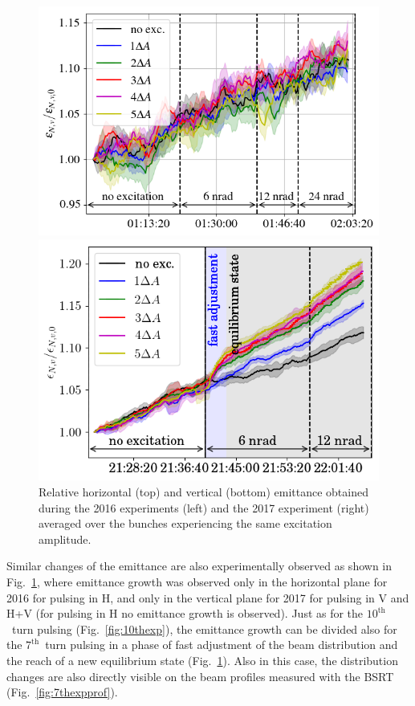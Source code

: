 \documentclass[%
 reprint,
 amsmath,amssymb,
 aps,
prstab,
]{revtex4-1}
\begin{document}
\begin{figure}[h]
\begin{minipage}[t]{0.49\linewidth}
	\end{minipage}	
	\begin{minipage}[t]{0.49\linewidth}
		\centering
		\includegraphics[width=1.0\linewidth]{2016_emitv_avg_rel_h7th_no_damper.png}
	\end{minipage}	
	\begin{minipage}[t]{0.49\linewidth}
		\centering
		\includegraphics[width=1.0\linewidth]{2017_emitv_avg_rel_hv7th_no_damper.png}
	\end{minipage}	
	\caption{\label{fig:7thexp} Relative horizontal (top) and vertical (bottom) emittance obtained during the 2016 experiments (left) and the 2017 experiment (right) averaged over the bunches experiencing the same excitation amplitude.}
\end{figure}
Similar changes of the emittance are also experimentally observed as shown in Fig.~\ref{fig:7thexp}, where emittance growth was observed only in the horizontal plane for 2016 for pulsing in H, and only in the vertical plane for 2017 for pulsing in V and H+V (for pulsing in H no emittance growth is observed). Just as for the $10^{\mathrm{th}}$~turn pulsing (Fig.~\ref{fig:10thexp}), the emittance growth can be divided also for the $7^{\mathrm{th}}$~turn pulsing in a phase of fast adjustment of the beam distribution and the reach of a new equilibrium state (Fig.~\ref{fig:7thexp}). Also in this case, the distribution changes are also directly visible on the beam profiles measured with the BSRT (Fig.~\ref{fig:7thexpprof}).
\end{document}
